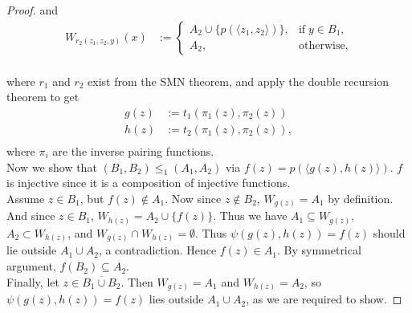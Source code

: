 \documentclass{article}
\begin{document}
\begin{enumerate}[label={\bf Q\arabic*:}]
\begin{proof}
      and
      \begin{align*}
        W_{r_2(z_1,z_2,y)}(x) &:=
        \begin{cases}
          A_2\cup\{p(\langle z_1,z_2\rangle)\}, &\text{if}\; y\in B_1,\\
          A_2, &\text{otherwise},
        \end{cases}\\
      \end{align*}

      where $r_1$ and $r_2$ exist from the SMN theorem, and apply the
      double recursion theorem to get
      \begin{align*}
        g(z) &:= t_1(\pi_1(z),\pi_2(z))\\
        h(z) &:= t_2(\pi_1(z),\pi_2(z)),\\
      \end{align*}
      where $\pi_i$ are the inverse pairing functions. \\

      Now we show that $(B_1,B_2)\leq_1(A_1,A_2)$ via $f(z)=p(\langle
      g(z),h(z)\rangle)$. $f$ is injective since it is a composition of
      injective functions.\\

      Assume $z\in B_1$, but $f(z)\not\in A_1$. Now
      since $z\not\in B_2$, $W_{g(z)}=A_1$ by definition. And since $z\in
      B_1$, $W_{h(z)}=A_2\cup\{f(z)\}$. Thus we have $A_1\subseteq
      W_{g(z)}$, $A_2\subset W_{h(z)}$, and $W_{g(z)}\cap
      W_{h(z)}=\emptyset$. Thus $\psi(g(z),h(z))=f(z)$ should lie outside
      $A_1\cup A_2$, a contradiction. Hence $f(z)\in A_1$. By symmetrical
      argument, $f(B_2)\subseteq A_2$. \\

      Finally, let $z\in\overline{B_1\cup B_2}$. Then $W_{g(z)}=A_1$ and
      $W_{h(z)}=A_2$, so $\psi(g(z),h(z))=f(z)$ lies outside
      $A_1\cup A_2$, as we are required to show.




\end{proof}
\end{enumerate}
\end{document}
